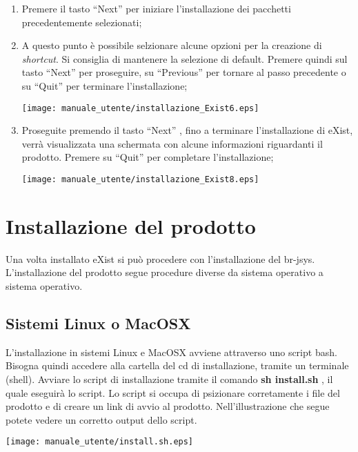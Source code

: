 \begin{enumerate}
\item Premere il tasto ``Next'' per iniziare l'installazione dei pacchetti precedentemente selezionati;
\item A questo punto \`e possibile selzionare alcune opzioni per la creazione di \textit{shortcut}. Si consiglia di mantenere la selezione di default. Premere quindi sul tasto ``Next'' per proseguire, su ``Previous'' per tornare al passo precedente o su ``Quit'' per terminare l'installazione;
\begin{center}
\texttt{[image: manuale\_utente/installazione\_Exist6.eps]}\\
\end{center}
\item Proseguite premendo il tasto ``Next'' , fino a terminare l'installazione di eXist, verr\`a visualizzata una schermata con alcune informazioni riguardanti il prodotto. Premere su ``Quit'' per completare l'installazione;
\begin{center}
\texttt{[image: manuale\_utente/installazione\_Exist8.eps]}\\
\end{center}
\end{enumerate}

\section{Installazione del prodotto}
Una volta installato eXist si pu\`o procedere con l'installazione del br-jsys.
L'installazione del prodotto segue procedure diverse da sistema operativo a sistema operativo.

\subsection{Sistemi Linux o MacOSX}
L'installazione in sistemi Linux e MacOSX avviene attraverso uno script bash. Bisogna quindi  accedere alla cartella del cd di installazione,  tramite un terminale (shell). Avviare lo script di installazione tramite il comando \textbf{sh install.sh} , il quale eseguir\`a lo script.
Lo script si occupa di psizionare corretamente i file del prodotto e di creare un link di avvio al prodotto.
Nell'illustrazione che segue potete vedere un corretto output dello script.\\
\begin{center}
\texttt{[image: manuale\_utente/install.sh.eps]}\\
\end{center}

